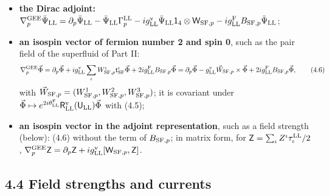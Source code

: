 \documentclass[
  10pt,
]{article}
\providecommand{\tightlist}{%
  \setlength{\itemsep}{0pt}\setlength{\parskip}{0pt}}
\begin{document}
\begin{itemize}
\tightlist
\item
  \textbf{the Dirac adjoint:}
  \(\nabla^{\rm GEE}_p\bar\Psi_{\rm LL}=\partial_p\bar\Psi_{\rm LL}-\bar\Psi_{\rm LL}\Gamma^{\rm LL}_p-ig^{\rm v}_{\rm LL}\bar\Psi_{\rm LL}\mathsf 1_4\otimes\mathsf W_{{\rm SF},p}-ig^{\rm F}_{\rm LL}B_{{\rm SF},p}\bar\Psi_{\rm LL}\);
\item
  \textbf{an isospin vector of fermion number 2 and spin 0}, such as the
  pair field of the superfluid of Part II:
  \[\nabla^{\rm GEE}_p\vec\Phi=\partial_p\vec\Phi+ig^{\rm v}_{\rm LL}\sum_\iota W^\iota_{{\rm SF},p}\mathsf t^\iota_{\rm SF}\vec\Phi+2ig^{\rm F}_{\rm LL}B_{{\rm SF},p}\vec\Phi=\partial_p\vec\Phi-g^{\rm v}_{\rm LL}\vec W_{{\rm SF},p}\times\vec\Phi+2ig^{\rm F}_{\rm LL}B_{{\rm SF},p}\vec\Phi,\tag{4.6}\]
  with
  \(\vec W_{{\rm SF},p}=(W^1_{{\rm SF},p},W^2_{{\rm SF},p},W^3_{{\rm SF},p})\);
  it is covariant under
  \(\vec\Phi\mapsto e^{2i\theta^{\rm F}_{\rm LL}}\mathsf R^{\rm v}_{\rm LL}(\mathsf U_{\rm LL})\vec\Phi\)
  with (4.5);
\item
  \textbf{an isospin vector in the adjoint representation}, such as a
  field strength (below): (4.6) without the term of \(B_{{\rm SF},p}\);
  in matrix form, for
  \(\mathsf Z=\sum_\iota Z^\iota\tau^{\rm LL}_\iota/2\),
  \(\nabla^{\rm GEE}_p\mathsf Z=\partial_p\mathsf Z+ig^{\rm v}_{\rm LL}[\mathsf W_{{\rm SF},p},\mathsf Z]\).
\end{itemize}

\hypertarget{field-strengths-and-currents}{%
\subsection{4.4 Field strengths and
currents}\label{field-strengths-and-currents}}
\end{document}
